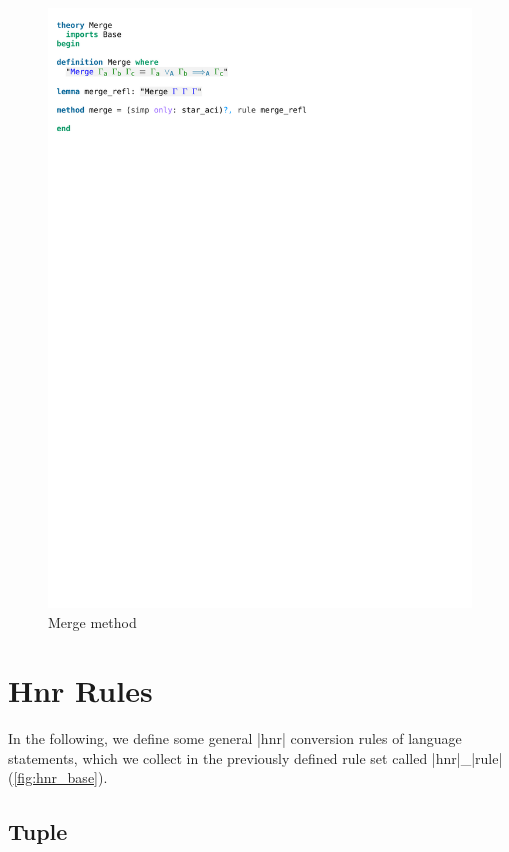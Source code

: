 \begin{figure}[htpb]
    \includegraphics[trim={0 24,4cm 0 3,9cm}, clip, width=1.00\textwidth]{figures/Theory_Merge.pdf}
    \caption[Merge method]{Merge method}
    \label{fig:merge_method}
\end{figure}

\section{Hnr Rules}

In the following, we define some general |hnr| conversion rules of language statements, which we collect in the previously defined rule set called |hnr|\_|rule| (\autoref{fig:hnr_base}).

\subsection{Tuple}

